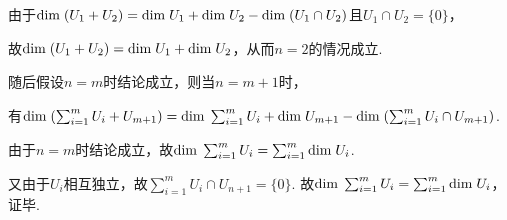 由于\(\mathrm{dim \;} (U_1+U_2)=\mathrm{dim \;} U_1+\mathrm{dim \;} U_2-\mathrm{dim \;} (U_1\cap U_2)\)且\(U_1\cap U_2=\{0\}\)，

故\(\mathrm{dim \;} (U_1+U_2)=\mathrm{dim \;} U_1+\mathrm{dim \;} U_2\)，从而\(n=2\)的情况成立.

随后假设\(n=m\)时结论成立，则当\(n=m+1\)时，

有\(\mathrm{dim \;} (\sum_{i=1}^m U_i+U_{m+1})=\mathrm{dim \;} \sum_{i=1}^m U_i+\mathrm{dim \;} U_{m+1}-\mathrm{dim \;} (\sum_{i=1}^m U_i \cap U_{m+1})\).

由于\(n=m\)时结论成立，故\(\mathrm{dim \;} \sum_{i=1}^m U_i=\sum_{i=1}^m \mathrm{dim \;} U_i\).

又由于\(U_i\)相互独立，故\(\sum_{i=1}^m U_i \cap U_{n+1}=\{0\}\).
故\(\mathrm{dim \;} \sum_{i=1}^m U_i=\sum_{i=1}^m \mathrm{dim \;} U_i\)，证毕.

